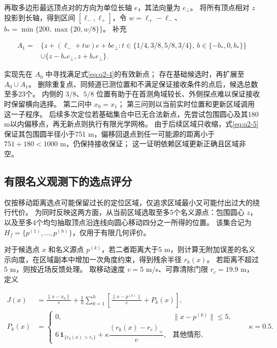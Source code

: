 再取多边形最远顶点对的方向为单位长轴 \(e\)，其法向量为 \(e_\perp\)。
将所有顶点相对 \(z\) 投影到长轴，得到区间 \([\ell_-,\ell_+]\)，令 \(w=\ell_+-\ell_-\)、\(b_*=\min\{200,\max\{20,w/8\}\}\)。
补充

\begin{equation}\label{eq:q2-7}
\begin{aligned}
A_1={}&\{z+(\ell_-+tw)e+b e_\perp:
t\in\{1/4,3/8,5/8,3/4\},\ b\in\{-b_*,0,b_*\}\}\\
&\cup\{z-b_*e_\perp,z+b_*e_\perp\}.
\end{aligned}
\end{equation}

实现先在 \(A_0\) 中寻找满足式\eqref{eq:q2-4}的有效新点；
存在基础候选时，再扩展至 \(A_0\cup A_1\)。
删除重复点、同频道已测位置和不满足保证接收条件的点后，候选总数至多23个。
内侧的 \(3/8\)、\(5/8\) 位置有助于在首测角域较长、外侧探点难以保证接收时保留横向选择。
第二问中 \(x_0=x_1\)；
第三问则以当前实时位置和更新区域调用这一子程序。
后续多次定位若基础集合中已无合法新点，先尝试包围圆心及其180 m以内偏移点，再无新点则执行有限光学网格。
由于后续区域只收缩，式\eqref{eq:q2-5}保证其包围圆半径小于751 m，偏移回退点到任一可能源的距离小于 \(751+180<1000\) m，仍保持接收保证；
这一证明依赖区域更新正确且区域非空。

\subsection{有限名义观测下的选点评分}\label{sec:q2-4}

仅按移动距离选点可能保留过长的定位区域，仅追求区域最小又可能付出过大的绕行代价。
为同时反映这两方面，从当前区域选取至多5个名义源点：包围圆心 \(z\)，以及至多4个均匀抽取顶点沿连线向圆心移动四分之一所得的位置。
该集合记为 \(H_f=\{p^{(1)},\ldots,p^{(h)}\}\)，仅用于有限几何评价。

对于候选点 \(x\) 和名义源点 \(p^{(k)}\)，若二者距离大于5 m，则计算无附加误差的名义示向度，在区域副本中增加一次角度约束，得到残余半径 \(r_k(x)\)。
若距离不超过5 m，则按近场反馈处理。
取移动速度 \(v=5\) m/s、可靠清除门限 \(r_c=19.9\) m，定义

\begin{equation}\label{eq:q2-8}
\begin{aligned}
J(x)&=\frac{\|x-x_0\|}{v}
+\frac1h\sum_{k=1}^{h}\left[\frac{\|x-p^{(k)}\|}{v}+P_k(x)\right],\\
P_k(x)&=\begin{cases}
0,&\|x-p^{(k)}\|\le5,\\
6\,\mathbf1_{\{r_k(x)>r_c\}}
+\kappa\dfrac{(r_k(x)-r_c)_+}{v},&\text{其他情形},
\end{cases}\qquad\kappa=0.5.
\end{aligned}
\end{equation}

